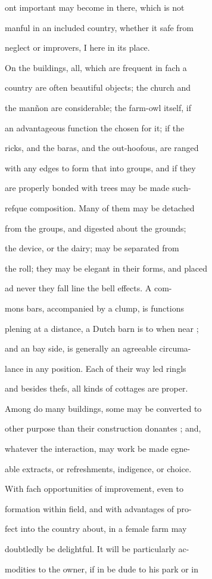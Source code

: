 \documentclass{article}
\begin{document}
ont important may become in there, which is not

manful in an included country, whether it safe from

neglect or improvers, I here in its place.

On the buildings, all, which are frequent in fach a

country are often beautiful objects; the church and

the manñon are considerable; the farm-owl itself, if

an advantageous function the chosen for it; if the

ricks, and the baras, and the out-hoofous, are ranged

with any edges to form that into groups, and if they

are properly bonded with trees may be made such-

refque composition. Many of them may be detached

from the groups, and digested about the grounds;

the device, or the dairy; may be separated from

the roll; they may be elegant in their forms, and placed

ad never they fall line the bell effects. A com-

mons bars, accompanied by a clump, is functions

plening at a distance, a Dutch barn is to when near ;

and an bay side, is generally an agreeable circuma-

lance in any position. Each of their way led ringls

and besides thefs, all kinds of cottages are proper.

Among do many buildings, some may be converted to

other purpose than their construction donantes ; and,

whatever the interaction, may work be made egne-

able extracts, or refreshments, indigence, or choice.

With fach opportunities of improvement, even to

formation within field, and with advantages of pro-

fect into the country about, in a female farm may

doubtledly be delightful. It will be particularly ac-

modities to the owner, if in be dude to his park or in
\end{document}
